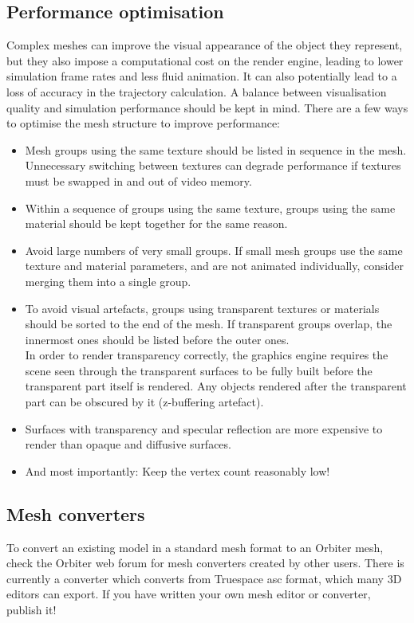 \documentclass[Orbiter Developer Manual.tex]{subfiles}
\begin{document}
\break
\subsection{Performance optimisation}
Complex meshes can improve the visual appearance of the object they represent, but they also impose a computational cost on the render engine, leading to lower simulation frame rates and less fluid animation. It can also potentially lead to a loss of accuracy in the trajectory calculation. A balance between visualisation quality and simulation performance should be kept in mind. There are a few ways to optimise the mesh structure to improve performance:

\begin{itemize}
\item Mesh groups using the same texture should be listed in sequence in the mesh. Unnecessary switching between textures can degrade performance if textures must be swapped in and out of video memory.
\item Within a sequence of groups using the same texture, groups using the same material should be kept together for the same reason.
\item Avoid large numbers of very small groups. If small mesh groups use the same texture and material parameters, and are not animated individually, consider merging them into a single group.
\item To avoid visual artefacts, groups using transparent textures or materials should be sorted to the end of the mesh. If transparent groups overlap, the innermost ones should be listed before the outer ones.\\
In order to render transparency correctly, the graphics engine requires the scene seen through the transparent surfaces to be fully built before the transparent part itself is rendered. Any objects rendered after the transparent part can be obscured by it (z-buffering artefact).
\item Surfaces with transparency and specular reflection are more expensive to render than opaque and diffusive surfaces.
\item And most importantly: Keep the vertex count reasonably low!
\end{itemize}


\subsection{Mesh converters}
To convert an existing model in a standard mesh format to an Orbiter mesh, check the Orbiter web forum for mesh converters created by other users. There is currently a converter which converts from Truespace asc format, which many 3D editors can export. If you have written your own mesh editor or converter, publish it!
\end{document}
